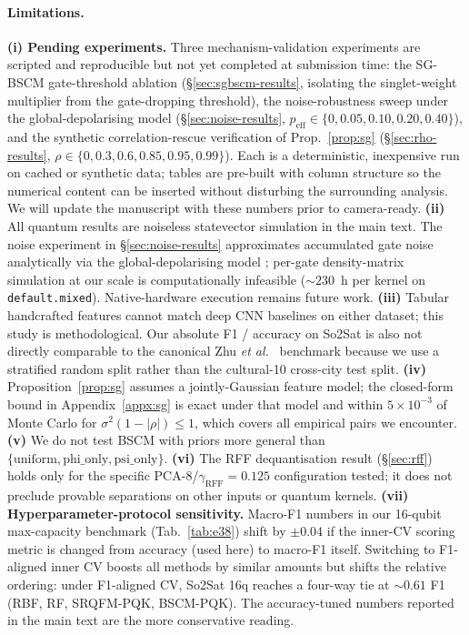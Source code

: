 \documentclass[pdflatex,sn-mathphys-num]{sn-jnl}
\theoremstyle{thmstyleone}
\theoremstyle{thmstyletwo}
\theoremstyle{thmstylethree}
\begin{document}
\paragraph{Limitations.}
\textbf{(i) Pending experiments.} Three mechanism-validation
experiments are scripted and reproducible but not yet completed at
submission time: the SG-BSCM gate-threshold ablation
(\S\ref{sec:sgbscm-results}, isolating the singlet-weight multiplier
from the gate-dropping threshold), the noise-robustness sweep under
the global-depolarising model (\S\ref{sec:noise-results}, $p_{\text{eff}}\in\{0,0.05,0.10,0.20,0.40\}$),
and the synthetic correlation-rescue verification of
Prop.~\ref{prop:sg} (\S\ref{sec:rho-results},
$\rho\in\{0,0.3,0.6,0.85,0.95,0.99\}$). Each is a deterministic,
inexpensive run on cached or synthetic data; tables are pre-built with
column structure so the numerical content can be inserted without
disturbing the surrounding analysis. We will update the manuscript
with these numbers prior to camera-ready.
\textbf{(ii)} All quantum results are noiseless statevector simulation
in the main text. The noise experiment in
\S\ref{sec:noise-results} approximates accumulated gate noise
analytically via the global-depolarising model
\cite{heyraud2022,schnabel2025}; per-gate density-matrix simulation
at our scale is computationally infeasible
($\sim\!230$~h per kernel on \texttt{default.mixed}).
Native-hardware execution remains future work.
\textbf{(iii)} Tabular handcrafted features cannot match deep CNN
baselines on either dataset; this study is methodological. Our
absolute F1 / accuracy on So2Sat is also not directly comparable to
the canonical Zhu \emph{et al.}\ \cite{zhu2020} benchmark because we
use a stratified random split rather than the cultural-10
cross-city test split.
\textbf{(iv)} Proposition~\ref{prop:sg} assumes a jointly-Gaussian
feature model; the closed-form bound in Appendix~\ref{appx:sg} is
exact under that model and within $5\times 10^{-3}$ of Monte Carlo
for $\sigma^2(1-|\rho|)\le 1$, which covers all empirical pairs we
encounter.
\textbf{(v)} We do not test BSCM with priors more general than
$\{\text{uniform}, \text{phi\_only}, \text{psi\_only}\}$.
\textbf{(vi)} The RFF dequantisation result (\S\ref{sec:rff}) holds
only for the specific PCA-8/$\gamma_{\text{RFF}}=0.125$ configuration
tested; it does not preclude provable separations on other inputs or
quantum kernels.
\textbf{(vii) Hyperparameter-protocol sensitivity.} Macro-F1 numbers
in our 16-qubit max-capacity benchmark (Tab.~\ref{tab:e38}) shift by
${\pm}0.04$ if the inner-CV scoring metric is changed from accuracy
(used here) to macro-F1 itself. Switching to F1-aligned inner CV
boosts all methods by similar amounts but shifts the relative
ordering: under F1-aligned CV, So2Sat 16q reaches a four-way tie at
$\sim\!0.61$ F1 (RBF, RF, SRQFM-PQK, BSCM-PQK). The accuracy-tuned
numbers reported in the main text are the more conservative reading.
\end{document}
